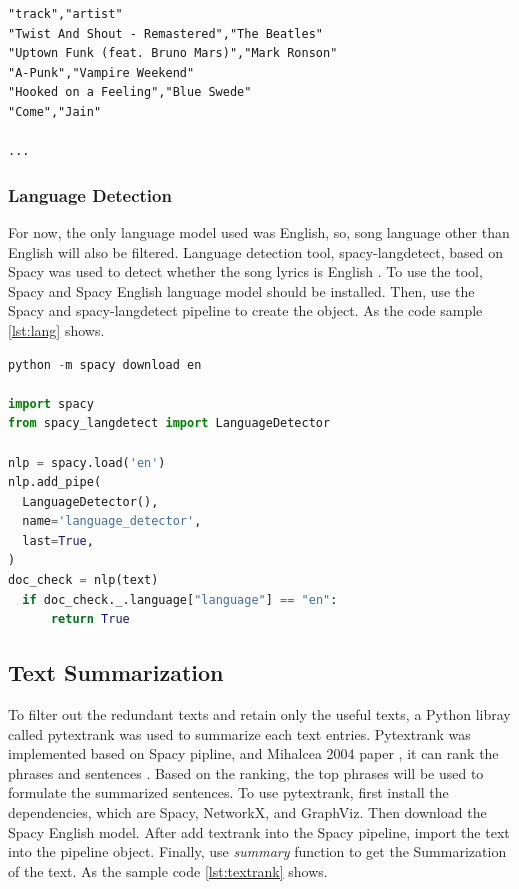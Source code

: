\begin{lstlisting}[label={lst:csv}, caption=Spotify Pliaylist]
"track","artist"
"Twist And Shout - Remastered","The Beatles"
"Uptown Funk (feat. Bruno Mars)","Mark Ronson"
"A-Punk","Vampire Weekend"
"Hooked on a Feeling","Blue Swede"
"Come","Jain"

...
\end{lstlisting}

\subsubsection{Language Detection}

For now, the only language model used was English, so, song language other than
English will also be filtered. Language detection tool, spacy-langdetect, based
on Spacy was used to detect whether the song lyrics is English \cite{langdetect}.
To use the tool, Spacy and Spacy English language model should be installed.
Then, use the Spacy and spacy-langdetect pipeline to create the object. As the
code sample \ref{lst:lang} shows.

\begin{lstlisting}[language=Python, label={lst:lang}, caption=Spacy Language Detection]
python -m spacy download en

import spacy
from spacy_langdetect import LanguageDetector

nlp = spacy.load('en')
nlp.add_pipe(
  LanguageDetector(),
  name='language_detector',
  last=True,
)
doc_check = nlp(text)
  if doc_check._.language["language"] == "en":
      return True
\end{lstlisting}

\subsection{Text Summarization}

To filter out the redundant texts and retain only the useful texts, a Python libray
called pytextrank was used to summarize each text entries. Pytextrank was implemented
based on Spacy pipline, and Mihalcea 2004 paper \cite{mihalcea2004textrank}, it
can rank the phrases and sentences \cite{pytextrank}. Based on the ranking, the
top phrases will be used to formulate the summarized sentences. To use pytextrank,
first install the dependencies, which are Spacy, NetworkX, and GraphViz. Then
download the Spacy English model. After add textrank into the Spacy pipeline,
import the text into the pipeline object. Finally, use \emph{summary} function
to get the Summarization of the text. As the sample code \ref{lst:textrank} shows.

